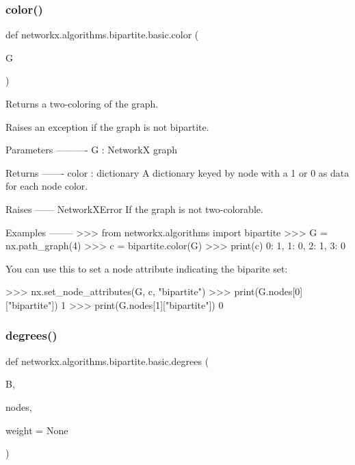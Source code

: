 \subsubsection{\texorpdfstring{color()}{color()}}
{\footnotesize\ttfamily def networkx.\+algorithms.\+bipartite.\+basic.\+color (\begin{DoxyParamCaption}\item[{}]{G }\end{DoxyParamCaption})}

\begin{DoxyVerb}Returns a two-coloring of the graph.

Raises an exception if the graph is not bipartite.

Parameters
----------
G : NetworkX graph

Returns
-------
color : dictionary
    A dictionary keyed by node with a 1 or 0 as data for each node color.

Raises
------
NetworkXError
    If the graph is not two-colorable.

Examples
--------
>>> from networkx.algorithms import bipartite
>>> G = nx.path_graph(4)
>>> c = bipartite.color(G)
>>> print(c)
{0: 1, 1: 0, 2: 1, 3: 0}

You can use this to set a node attribute indicating the biparite set:

>>> nx.set_node_attributes(G, c, "bipartite")
>>> print(G.nodes[0]["bipartite"])
1
>>> print(G.nodes[1]["bipartite"])
0
\end{DoxyVerb}
 \mbox{\label{namespacenetworkx_1_1algorithms_1_1bipartite_1_1basic_a3f81ac1d3e9ad819f508fb97ce748830}} 
\subsubsection{\texorpdfstring{degrees()}{degrees()}}
{\footnotesize\ttfamily def networkx.\+algorithms.\+bipartite.\+basic.\+degrees (\begin{DoxyParamCaption}\item[{}]{B,  }\item[{}]{nodes,  }\item[{}]{weight = {\ttfamily None} }\end{DoxyParamCaption})}

